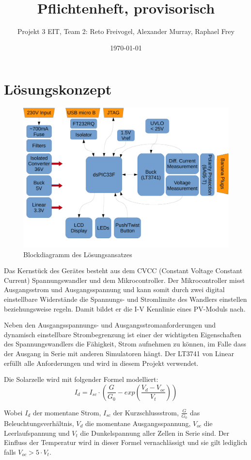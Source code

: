 \documentclass{article}
\title{Pflichtenheft, provisorisch}
\date{\today}
\author{Projekt 3 EIT, Team 2: Reto Freivogel, Alexander Murray, Raphael Frey}
\begin{document}
\maketitle

\section{L\"osungskonzept}
\begin{figure}[h!]
    \begin{centering}
    \includegraphics[width=.667\textwidth]{grob-blockdiagramm.pdf}
    \caption{Blockdiagramm des L\"osungsansatzes}
    \end{centering}
\end{figure}

Das Kernst\"uck des Ger\"ates besteht  aus dem CVCC (Constant Voltage Constant
Current) Spannungswandler  und dem Mikrocontroller. Der  Mikrocontroller misst
Ausgangsstrom  und   Ausgangsspannung  und  kann  somit   durch  zwei  digital
einstellbare  Widerst\"ande  die  Spannungs-   und  Stromlimite  des  Wandlers
einstellen  beziehungsweise regeln. Damit  bildet er  die I-V  Kennlinie eines
PV-Moduls nach.

Neben den Ausgangsspannungs- und Ausgangsstromanforderungen und dynamisch
einstellbare Strombegrenzung ist einer der wichtigsten Eigenschaften des
Spannungswandlers die F\"ahigkeit, Strom aufnehmen zu k\"onnen, im Falle dass
der Ausgang in Serie mit anderen Simulatoren h\"angt. Der LT3741 von Linear
erf\"ullt alle Anforderungen und wird in diesem Projekt verwendet.

Die Solarzelle wird mit folgender Formel modelliert:
\begin{equation}
I_d = I_{sc} \cdot \left(\frac{G}{G_0} - exp\left(\frac{V_d-V_{oc}}{V_t}\right)\right)
\end{equation}

Wobei   $I_{d}$   der   momentane  Strom,   $I_{sc}$   der   Kurzschlussstrom,
$\frac{G}{G_0}$    das   Beleuchtungsverh\"altnis,    $V_d$   die    momentane
Ausgangsspannung, $V_{oc}$  die Leerlaufspannung und $V_t$  die Dunkelspannung
aller Zellen in Serie sind. Der Einfluss der Temperatur wird in dieser Formel
vernachl\"assigt und sie gilt lediglich falls $V_{oc} > 5 \cdot V_t$.
\end{document}
